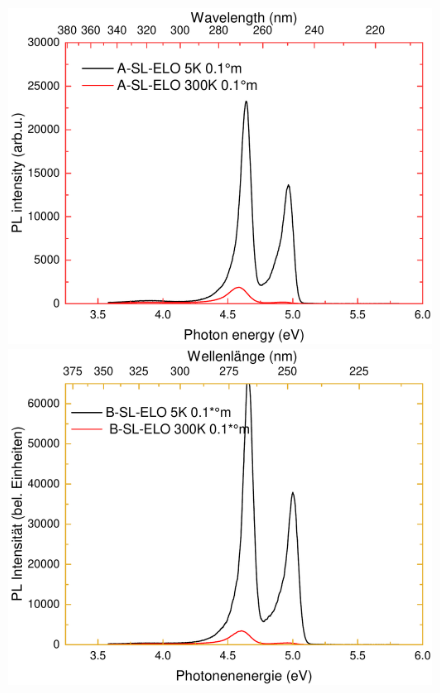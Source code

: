 \begin{figure}[htb]
  \centering
  \begin{minipage}[t]{0.49\textwidth}
    \centering
    \includegraphics[width=\textwidth]{Bilder/TS4048/aslelo.pdf}
  \end{minipage}
	\hfill
  \begin{minipage}[t]{0.49\textwidth}
    \centering
    \includegraphics[width=\linewidth]{Bilder/TS4048/bslelo.pdf}
  \end{minipage}
	\hfill
  \begin{minipage}[t]{0.49\textwidth}
    \centering

\end{minipage}
\end{figure}
